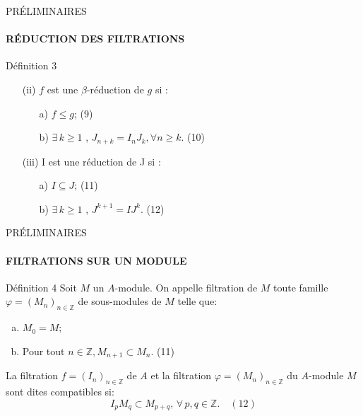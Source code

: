 \documentclass[11pt,a4paper]{beamer}
\begin{document}
		\begin{frame}{PRÉLIMINAIRES}
		\framesubtitle{RÉDUCTION DES FILTRATIONS}
		\begin{block}{Définition 3}
			\begin{enumerate}
				\item[(ii)] $f$ est une $\beta$-réduction de $g$ si : \\
				\begin{enumerate}
					\item[a)] $f \leq g$; (9)
					\item[b)]  $\exists \, k \geq 1$ , $J_{n+k} = I_n J_k , \forall n \geq k$. (10)
				\end{enumerate}
				\item[(iii)] I est une réduction de J si : \\
				\begin{enumerate}
					\item[a)] $I \subseteq J$; (11)
					\item[b)]  $\exists \, k \geq 1$ , $J^{k+1} = I J^k.$ (12)
				\end{enumerate}
			\end{enumerate}
		\end{block}
	\end{frame}
	
		\begin{frame}{PRÉLIMINAIRES}
		\framesubtitle{FILTRATIONS SUR UN MODULE}
		\begin{block}{Définition 4}
		Soit $M$ un $A$-module. On appelle filtration de $M$ toute famille $\varphi = (M_n)_{n \in \mathbb{Z}}$ de sous-modules de $M$ telle que:
			\begin{enumerate}[(a)]
				\item $M_0 = M$;
				\item Pour tout $n \in \mathbb{Z}, M_{n+1} \subset M_n$. (11)
			\end{enumerate}
			La filtration $f = (I_n)_{n \in \mathbb{Z}}$ de $A$ et la filtration $\varphi = (M_n)_{n \in \mathbb{Z}}$ du $A$-module $M$ sont dites compatibles si:
			\[ I_p M_q \subset M_{p+q} ,\, \forall \, p, q \in \mathbb{Z}. \quad (12)\]
		\end{block}
	\end{frame}
	
\end{document}
